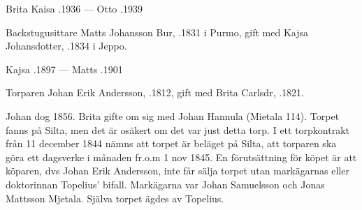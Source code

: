 Brita Kaisa .1936  ---  Otto .1939


%
Backstugusittare Matts Johansson Bur, .1831 i Purmo, gift med Kajsa Johansdotter, .1834 i Jeppo.
\begin{jhchildren}
  \item {}
  \item {}
  \item {}
  \item {}
  \item {}
\end{jhchildren}

Kajsa .1897  ---  Matts .1901


%
Torparen Johan Erik Andersson,  .1812, gift med Brita Carlsdr, .1821.
\begin{jhchildren}
  \item {}
  \item {}
  \item {}
\end{jhchildren}

Johan dog 1856. Brita gifte om sig med Johan Hannula (Mietala 114). Torpet fanns på Silta, men det är osäkert om det var just detta torp. I ett torpkontrakt från 11 december 1844 nämns att torpet är beläget på Silta, att torparen ska göra ett dagsverke i månaden fr.o.m 1 nov 1845. En förutsättning för köpet är att köparen, dvs Johan Erik Andersson, inte får sälja torpet utan markägarnas eller doktorinnan Topelius' bifall. Markägarna var Johan Samuelsson och Jonas Mattsson Mjetala. Själva torpet ägdes av Topelius.



%


